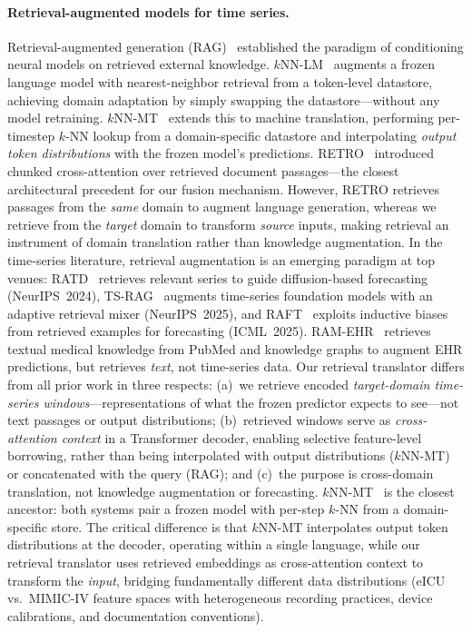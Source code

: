 \paragraph{Retrieval-augmented models for time series.}
Retrieval-augmented generation (RAG)~\cite{lewis2020rag} established the paradigm of
conditioning neural models on retrieved external knowledge.
$k$NN-LM~\cite{khandelwal2020knnlm} augments a frozen language model with nearest-neighbor
retrieval from a token-level datastore, achieving domain adaptation by simply swapping the
datastore---without any model retraining.
$k$NN-MT~\cite{khandelwal2021knnmt} extends this to machine translation, performing
per-timestep $k$-NN lookup from a domain-specific datastore and interpolating
\emph{output token distributions} with the frozen model's predictions.
RETRO~\cite{borgeaud2022retro} introduced chunked cross-attention over retrieved document
passages---the closest architectural precedent for our fusion mechanism.
However, RETRO retrieves passages from the \emph{same} domain to augment language generation,
whereas we retrieve from the \emph{target} domain to transform \emph{source} inputs,
making retrieval an instrument of domain translation rather than knowledge augmentation.
In the time-series literature, retrieval augmentation is an emerging paradigm at top venues:
RATD~\cite{liu2024ratd} retrieves relevant series to guide diffusion-based forecasting
(NeurIPS~2024),
TS-RAG~\cite{ning2025tsrag} augments time-series foundation models with an adaptive
retrieval mixer (NeurIPS~2025),
and RAFT~\cite{raft2025} exploits inductive biases from retrieved examples for forecasting
(ICML~2025).
RAM-EHR~\cite{xu2024ramehr} retrieves textual medical knowledge from PubMed and
knowledge graphs to augment EHR predictions, but retrieves \emph{text}, not time-series data.
Our retrieval translator differs from all prior work in three respects:
(a)~we retrieve encoded \emph{target-domain time-series windows}---representations of what the
frozen predictor expects to see---not text passages or output distributions;
(b)~retrieved windows serve as \emph{cross-attention context} in a Transformer decoder,
enabling selective feature-level borrowing, rather than being interpolated with output
distributions ($k$NN-MT) or concatenated with the query (RAG); and
(c)~the purpose is cross-domain translation, not knowledge augmentation or forecasting.
$k$NN-MT~\cite{khandelwal2021knnmt} is the closest ancestor: both systems pair a frozen
model with per-step $k$-NN from a domain-specific store.
The critical difference is that $k$NN-MT interpolates output token distributions at
the decoder, operating within a single language, while our retrieval translator uses
retrieved embeddings as cross-attention context to transform the \emph{input}, bridging
fundamentally different data distributions (eICU vs.\ MIMIC-IV feature spaces with
heterogeneous recording practices, device calibrations, and documentation conventions).

